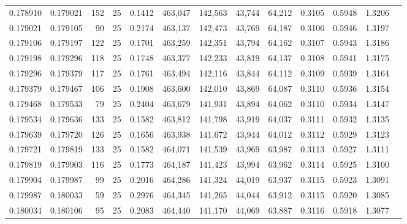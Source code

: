 \begin{tabular}{rrrrrrrrrrrrr}
0.178910 & 0.179021 &   152 &  25 &                                     0.1412 & 463,047 & 142,563 &  43,744 &  64,212 & 0.3105 & 0.5948 & 1.3206 \\
0.179021 & 0.179105 &    90 &  25 &                                     0.2174 & 463,137 & 142,473 &  43,769 &  64,187 & 0.3106 & 0.5946 & 1.3197 \\
0.179106 & 0.179197 &   122 &  25 &                                     0.1701 & 463,259 & 142,351 &  43,794 &  64,162 & 0.3107 & 0.5943 & 1.3186 \\
0.179198 & 0.179296 &   118 &  25 &                                     0.1748 & 463,377 & 142,233 &  43,819 &  64,137 & 0.3108 & 0.5941 & 1.3175 \\
0.179296 & 0.179379 &   117 &  25 &                                     0.1761 & 463,494 & 142,116 &  43,844 &  64,112 & 0.3109 & 0.5939 & 1.3164 \\
0.179379 & 0.179467 &   106 &  25 &                                     0.1908 & 463,600 & 142,010 &  43,869 &  64,087 & 0.3110 & 0.5936 & 1.3154 \\
0.179468 & 0.179533 &    79 &  25 &                                     0.2404 & 463,679 & 141,931 &  43,894 &  64,062 & 0.3110 & 0.5934 & 1.3147 \\
0.179534 & 0.179636 &   133 &  25 &                                     0.1582 & 463,812 & 141,798 &  43,919 &  64,037 & 0.3111 & 0.5932 & 1.3135 \\
0.179639 & 0.179720 &   126 &  25 &                                     0.1656 & 463,938 & 141,672 &  43,944 &  64,012 & 0.3112 & 0.5929 & 1.3123 \\
0.179721 & 0.179819 &   133 &  25 &                                     0.1582 & 464,071 & 141,539 &  43,969 &  63,987 & 0.3113 & 0.5927 & 1.3111 \\
0.179819 & 0.179903 &   116 &  25 &                                     0.1773 & 464,187 & 141,423 &  43,994 &  63,962 & 0.3114 & 0.5925 & 1.3100 \\
0.179904 & 0.179987 &    99 &  25 &                                     0.2016 & 464,286 & 141,324 &  44,019 &  63,937 & 0.3115 & 0.5923 & 1.3091 \\
0.179987 & 0.180033 &    59 &  25 &                                     0.2976 & 464,345 & 141,265 &  44,044 &  63,912 & 0.3115 & 0.5920 & 1.3085 \\
0.180034 & 0.180106 &    95 &  25 &                                     0.2083 & 464,440 & 141,170 &  44,069 &  63,887 & 0.3116 & 0.5918 & 1.3077 \\

\end{tabular}
